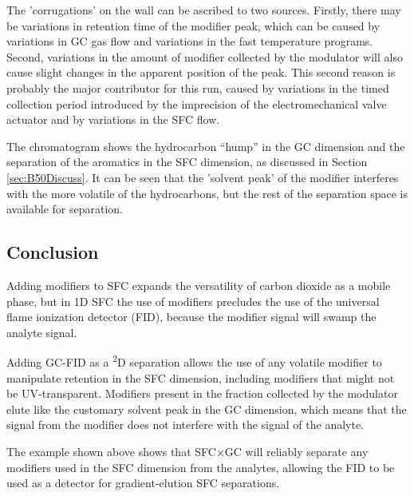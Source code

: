 The 'corrugations' on the wall can be ascribed to two sources. Firstly, there
may be variations in retention time of the modifier peak, which can be caused by
variations in GC gas flow and variations in the fast temperature programs.
Second, variations in the amount of modifier collected by the modulator will
also cause slight changes in the apparent position of the peak. This second
reason is probably the major contributor for this run, caused by variations in
the timed collection period introduced by the imprecision of the
electromechanical valve actuator and by variations in the SFC flow.

The chromatogram shows the hydrocarbon ``hump'' in the GC dimension and the
separation of the aromatics in the SFC dimension, as discussed in Section
\ref{sec:B50Discuss}. It can be seen that the 'solvent peak' of the modifier
interferes with the more volatile of the hydrocarbons, but the rest of the
separation space is available for separation.

\subsection{Conclusion}

Adding modifiers to SFC expands the versatility of carbon dioxide as a mobile
phase, but in 1D SFC the use of modifiers precludes the use of the universal
flame ionization detector (FID), because the modifier signal will swamp the
analyte signal.

Adding GC-FID as a \textsuperscript{2}D separation allows the use of any
volatile modifier to manipulate retention in the SFC dimension, including
modifiers that might not be UV-transparent. Modifiers present in the fraction
collected by the modulator elute like the customary solvent peak in the GC
dimension, which means that the signal from the modifier does not interfere with
the signal of the analyte.

The example shown above shows that SFC×GC will reliably separate any modifiers
used in the SFC dimension from the analytes, allowing the FID to be used as a
detector for gradient-elution SFC separations.

